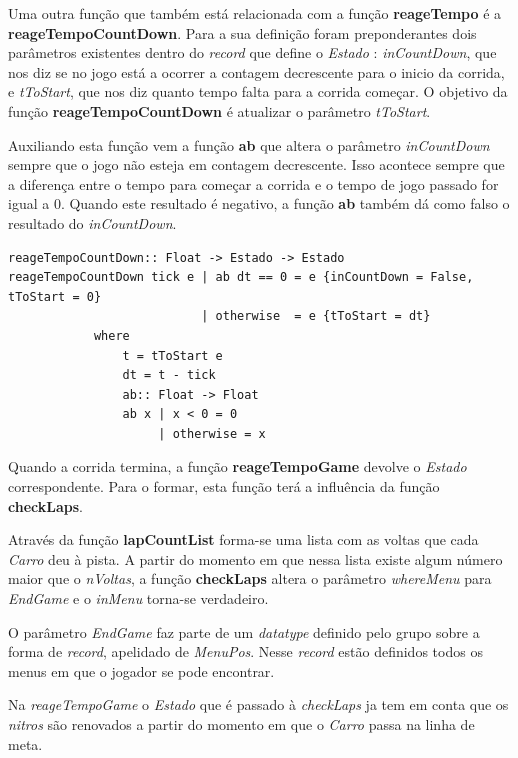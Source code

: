 \documentclass[a4paper]{report} %
\begin{document}
\normalsize

Uma outra função que também está relacionada com a função \textbf{reageTempo} é a \textbf{reageTempoCountDown}. Para a sua definição foram preponderantes dois parâmetros existentes dentro do \textit{record} que define o \emph{Estado} : \emph{inCountDown}, que nos diz se no jogo está a ocorrer a contagem decrescente para o inicio da corrida, e \emph{tToStart}, que nos diz quanto tempo falta para a corrida começar. O objetivo da função \textbf{reageTempoCountDown} é atualizar o parâmetro \emph{tToStart}.  

Auxiliando esta função vem a função \textbf{ab} que altera o parâmetro \emph{inCountDown} sempre que o jogo não esteja em contagem decrescente. Isso acontece sempre que a diferença entre o tempo para começar a corrida e o tempo de jogo passado for igual a 0. Quando este resultado é negativo, a função \textbf{ab} também dá como falso o resultado do \emph{inCountDown}.

\scriptsize

\begin{verbatim}
reageTempoCountDown:: Float -> Estado -> Estado
reageTempoCountDown tick e | ab dt == 0 = e {inCountDown = False, tToStart = 0}
                           | otherwise  = e {tToStart = dt}
            where
                t = tToStart e
                dt = t - tick
                ab:: Float -> Float
                ab x | x < 0 = 0
                     | otherwise = x 

\end{verbatim} 

\normalsize

Quando a corrida termina, a função \textbf{reageTempoGame} devolve o \emph{Estado} correspondente. Para o formar, esta função terá a influência da função \textbf{checkLaps}.

Através da função \textbf{lapCountList} forma-se uma lista com as voltas que cada \emph{Carro} deu à pista. A partir do momento em que nessa lista existe algum número maior que o \emph{nVoltas}, a função \textbf{checkLaps} altera o parâmetro \emph{whereMenu} para \emph{EndGame} e o \emph{inMenu} torna-se verdadeiro.

O parâmetro \emph{EndGame} faz parte de um \emph{datatype} definido pelo grupo sobre a forma de \textit{record}, apelidado de \emph{MenuPos}. Nesse \textit{record} estão definidos todos os menus em que o jogador se pode encontrar.

Na \emph{reageTempoGame} o \emph{Estado} que é passado à \emph{checkLaps} ja tem em conta que os \emph{nitros} são renovados a partir do momento em que o \emph{Carro} passa na linha de meta.
\end{document}
